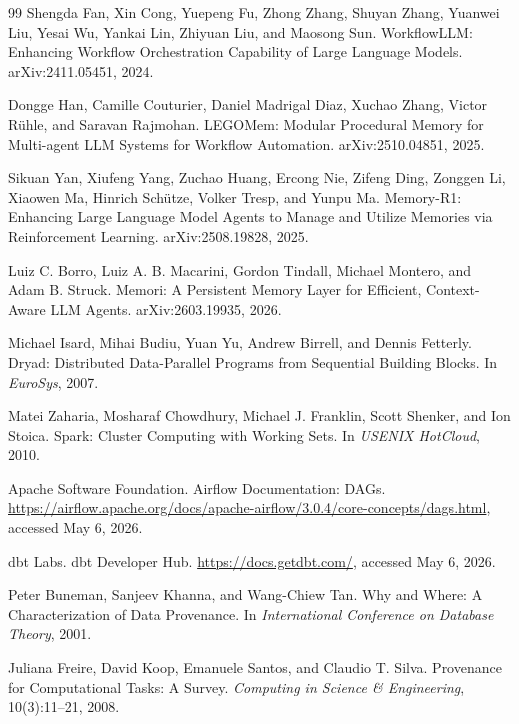 \documentclass{article}
\begin{document}
\begin{thebibliography}{99}
Shengda Fan, Xin Cong, Yuepeng Fu, Zhong Zhang, Shuyan Zhang, Yuanwei Liu, Yesai Wu, Yankai Lin, Zhiyuan Liu, and Maosong Sun.
\newblock WorkflowLLM: Enhancing Workflow Orchestration Capability of Large Language Models.
\newblock arXiv:2411.05451, 2024.

Dongge Han, Camille Couturier, Daniel Madrigal Diaz, Xuchao Zhang, Victor R\"uhle, and Saravan Rajmohan.
\newblock LEGOMem: Modular Procedural Memory for Multi-agent LLM Systems for Workflow Automation.
\newblock arXiv:2510.04851, 2025.

Sikuan Yan, Xiufeng Yang, Zuchao Huang, Ercong Nie, Zifeng Ding, Zonggen Li, Xiaowen Ma, Hinrich Sch\"utze, Volker Tresp, and Yunpu Ma.
\newblock Memory-R1: Enhancing Large Language Model Agents to Manage and Utilize Memories via Reinforcement Learning.
\newblock arXiv:2508.19828, 2025.

Luiz C. Borro, Luiz A. B. Macarini, Gordon Tindall, Michael Montero, and Adam B. Struck.
\newblock Memori: A Persistent Memory Layer for Efficient, Context-Aware LLM Agents.
\newblock arXiv:2603.19935, 2026.

Michael Isard, Mihai Budiu, Yuan Yu, Andrew Birrell, and Dennis Fetterly.
\newblock Dryad: Distributed Data-Parallel Programs from Sequential Building Blocks.
\newblock In \emph{EuroSys}, 2007.

Matei Zaharia, Mosharaf Chowdhury, Michael J. Franklin, Scott Shenker, and Ion Stoica.
\newblock Spark: Cluster Computing with Working Sets.
\newblock In \emph{USENIX HotCloud}, 2010.

Apache Software Foundation.
\newblock Airflow Documentation: DAGs.
\newblock \url{https://airflow.apache.org/docs/apache-airflow/3.0.4/core-concepts/dags.html}, accessed May 6, 2026.

dbt Labs.
\newblock dbt Developer Hub.
\newblock \url{https://docs.getdbt.com/}, accessed May 6, 2026.

Peter Buneman, Sanjeev Khanna, and Wang-Chiew Tan.
\newblock Why and Where: A Characterization of Data Provenance.
\newblock In \emph{International Conference on Database Theory}, 2001.

Juliana Freire, David Koop, Emanuele Santos, and Claudio T. Silva.
\newblock Provenance for Computational Tasks: A Survey.
\newblock \emph{Computing in Science \& Engineering}, 10(3):11--21, 2008.


\end{thebibliography}
\end{document}
